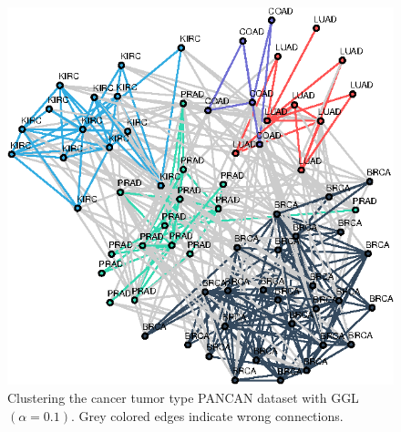 \begin{figure}[!htb]
  \centering
  \includegraphics[width=.475\textwidth]{cancer-rna/latex/figures/cancer-rna-graph-subset-ggl.eps}
  \caption{Clustering the cancer tumor type \textsf{PANCAN} dataset with \textsf{GGL}$(\alpha = 0.1)$.
            Grey colored edges indicate wrong connections.}
  \label{fig:cancer-gene-ggl}
\end{figure}
